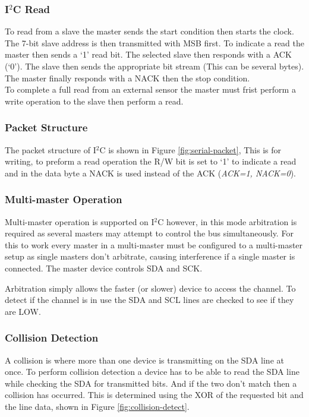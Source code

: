 \subsubsection{I$^2$C Read}
To read from a slave the master sends the start condition then starts the clock. The 7-bit slave
address is then transmitted with MSB first. To indicate a read the master then sends a `1' read bit.
The selected slave then responds with a ACK (`0'). The slave then sends the appropriate bit stream
(This can be several bytes). The master finally responds with a NACK then the stop condition.\\ 

\noindent To complete a full read from an external sensor the master must frist perform a write
operation to the slave then perform a read.

\subsubsection{Packet Structure}
The packet structure of I$^2$C is shown in Figure \ref{fig:serial-packet}, This is for writing, to
preform a read operation the R/W bit is set to `1' to indicate a read and in the data byte a NACK is
used instead of the ACK (\textit{ACK=1, NACK=0}). 


\subsubsection{Multi-master Operation}
Multi-master operation is supported on I$^2$C however, in this mode arbitration is required as
several masters may attempt to control the bus simultaneously. For this to work every master in a
multi-master must be configured to a multi-master setup as single masters don't arbitrate, causing
interference if a single master is connected. The master device controls SDA and SCK.

Arbitration simply allows the faster (or slower) device to access the channel. To detect if the
channel is in use the SDA and SCL lines are checked to see if they are LOW.

\subsubsection{Collision Detection}
A collision is where more than one device is transmitting on the SDA line at once. To perform
collision detection a device has to be able to read the SDA line while checking the SDA for
transmitted bits. And if the two don't match then a collision has occurred. This is determined using
the XOR of the requested bit and the line data, shown in Figure \ref{fig:collision-detect}.


